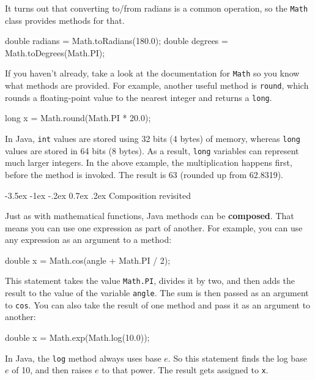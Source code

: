 \documentclass[12pt]{book}
\makeatletter
\theoremstyle{exercise}
\newcommand{\java}[1]{\verb"#1"}
\renewcommand{\section}{\@startsection {section}{1}{\z@}%
    {-3.5ex \@plus -1ex \@minus -.2ex}%
    {0.7ex \@plus.2ex}%
    {\normalfont\Large\bfseries}}
\newcommand{\java}[1]{\lstinline{#1}} %
\makeatother
\begin{document}
It turns out that converting to/from radians is a common operation, so the \java{Math} class provides methods for that.

\begin{code}
    double radians = Math.toRadians(180.0);
    double degrees = Math.toDegrees(Math.PI);
\end{code}


If you haven't already, take a look at the documentation for \java{Math} so you know what methods are provided.
For example, another useful method is \java{round}, which rounds a floating-point value to the nearest integer and returns a \java{long}.

\begin{code}
    long x = Math.round(Math.PI * 20.0);
\end{code}

In Java, \java{int} values are stored using 32 bits (4 bytes) of memory, whereas \java{long} values are stored in 64 bits (8 bytes).
As a result, \java{long} variables can represent much larger integers.
In the above example, the multiplication happens first, before the method is invoked.
The result is 63 (rounded up from 62.8319).

\section{Composition revisited}


Just as with mathematical functions, Java methods can be {\bf composed}.
That means you can use one expression as part of another.
For example, you can use any expression as an argument to a method:

\begin{code}
    double x = Math.cos(angle + Math.PI / 2);
\end{code}

This statement takes the value \java{Math.PI}, divides it by two, and then adds the result to the value of the variable \java{angle}.
The sum is then passed as an argument to \java{cos}.
You can also take the result of one method and pass it as an argument to another:

\begin{code}
    double x = Math.exp(Math.log(10.0));
\end{code}

In Java, the \java{log} method always uses base $e$.
So this statement finds the log base $e$ of 10, and then raises $e$ to that power.
The result gets assigned to \java{x}.
\end{document}
